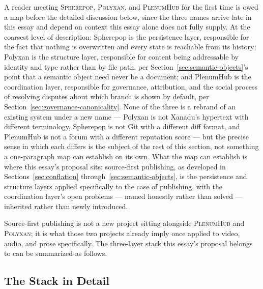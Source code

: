 \documentclass[11pt]{article}
\theoremstyle{definition}
\begin{document}
A reader meeting \textsc{Spherepop}, \textsc{Polyxan}, and \textsc{PlenumHub} for the first time is owed a map before the detailed discussion below, since the three names arrive late in this essay and depend on context this essay alone does not fully supply. At the coarsest level of description: Spherepop is the persistence layer, responsible for the fact that nothing is overwritten and every state is reachable from its history; Polyxan is the structure layer, responsible for content being addressable by identity and type rather than by file path, per Section~\ref{sec:semantic-objects}'s point that a semantic object need never be a document; and PlenumHub is the coordination layer, responsible for governance, attribution, and the social process of resolving disputes about which branch is shown by default, per Section~\ref{sec:governance-canonicality}. None of the three is a rebrand of an existing system under a new name --- Polyxan is not Xanadu's hypertext with different terminology, Spherepop is not Git with a different diff format, and PlenumHub is not a forum with a different reputation score --- but the precise sense in which each differs is the subject of the rest of this section, not something a one-paragraph map can establish on its own. What the map can establish is where this essay's proposal sits: source-first publishing, as developed in Sections~\ref{sec:conflation} through~\ref{sec:semantic-objects}, is the persistence and structure layers applied specifically to the case of publishing, with the coordination layer's open problems --- named honestly rather than solved --- inherited rather than newly introduced.

Source-first publishing is not a new project sitting alongside \textsc{PlenumHub} and \textsc{Polyxan}; it is what those two projects already imply once applied to video, audio, and prose specifically. The three-layer stack this essay's proposal belongs to can be summarized as follows.

\subsection{The Stack in Detail}
\end{document}
